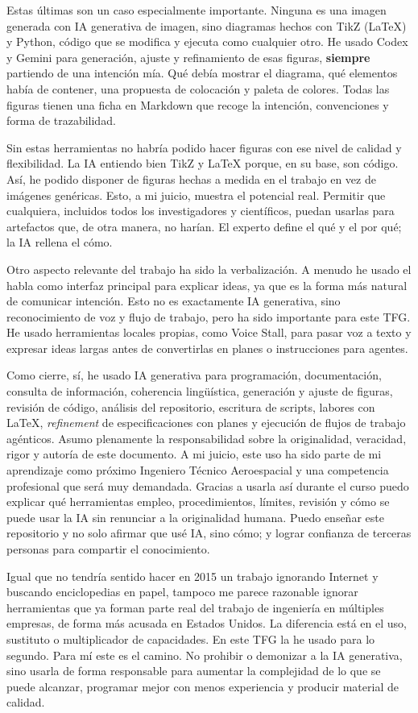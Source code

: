 Estas últimas son un caso especialmente importante. Ninguna es una imagen generada con IA
generativa de imagen, sino diagramas hechos con TikZ (LaTeX) y Python, código que se modifica
y ejecuta como cualquier otro. He usado Codex y Gemini para generación, ajuste y refinamiento
de esas figuras, \textbf{siempre} partiendo de una intención mía. Qué debía mostrar el diagrama, 
qué elementos había de contener, una propuesta de colocación y paleta de colores. Todas las figuras
tienen una ficha en Markdown que recoge la intención, convenciones y forma de trazabilidad.

Sin estas herramientas no habría podido hacer figuras con ese nivel de calidad y flexibilidad. La
IA entiendo bien TikZ y LaTeX porque, en su base, son código. Así, he podido disponer de figuras
hechas a medida en el trabajo en vez de imágenes genéricas. Esto, a mi juicio, muestra el potencial
real. Permitir que cualquiera, incluidos todos los investigadores y científicos, puedan usarlas para
artefactos que, de otra manera, no harían. El experto define el qué y el por qué; la IA rellena el cómo.

Otro aspecto relevante del trabajo ha sido la verbalización. A menudo he usado el habla como
interfaz principal para explicar ideas, ya que es la forma más natural de comunicar intención.
Esto no es exactamente IA generativa, sino reconocimiento de voz y flujo de trabajo,
pero ha sido importante para este TFG. He usado herramientas locales propias, como Voice Stall,
para pasar voz a texto y expresar ideas largas antes de convertirlas en planes o instrucciones
para agentes.

Como cierre, sí, he usado IA generativa para programación, documentación, consulta de información,
coherencia lingüística, generación y ajuste de figuras, revisión de código, análisis del repositorio,
escritura de scripts, labores con LaTeX, \textit{refinement} de especificaciones con planes y ejecución de
flujos de trabajo agénticos. Asumo plenamente la responsabilidad sobre la originalidad, veracidad, rigor y autoría de este
documento. A mi juicio, este uso ha sido parte de mi aprendizaje como próximo Ingeniero Técnico Aeroespacial y
una competencia profesional que será muy demandada. Gracias a usarla así durante el curso
puedo explicar qué herramientas empleo, procedimientos, límites, revisión y cómo se puede usar la IA sin
renunciar a la originalidad humana. Puedo enseñar este repositorio y no solo afirmar que usé IA, sino cómo;
y lograr confianza de terceras personas para compartir el conocimiento.

Igual que no tendría sentido hacer en 2015 un trabajo ignorando Internet y buscando 
enciclopedias en papel, tampoco me parece razonable ignorar herramientas que ya
forman parte real del trabajo de ingeniería en múltiples empresas, de forma más acusada en Estados Unidos. 
La diferencia está en el uso, sustituto o multiplicador de capacidades. En este TFG la he usado para
lo segundo. Para mí este es el camino. No prohibir o demonizar a la IA generativa, sino
usarla de forma responsable para aumentar la complejidad de lo que se puede alcanzar,
programar mejor con menos experiencia y producir material de calidad.